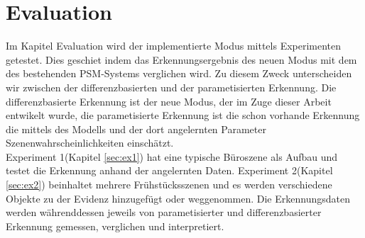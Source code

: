 \chapter{Evaluation}\label{ch:evaluation}
Im Kapitel Evaluation wird der implementierte Modus mittels Experimenten getestet. Dies geschiet indem das Erkennungsergebnis des neuen Modus mit dem des bestehenden PSM-Systems verglichen wird. Zu diesem Zweck unterscheiden wir zwischen der differenzbasierten und der parametisierten Erkennung. Die differenzbasierte Erkennung ist der neue Modus, der im Zuge dieser Arbeit entwikelt wurde, die parametisierte Erkennung ist die schon vorhande Erkennung die mittels des Modells und der dort angelernten Parameter Szenenwahrscheinlichkeiten einschätzt.\smallskip\\
Experiment 1(Kapitel \ref{sec:ex1}) hat eine typische Büroszene als Aufbau und testet die Erkennung anhand der angelernten Daten. Experiment 2(Kapitel \ref{sec:ex2}) beinhaltet mehrere Frühstücksszenen und es werden verschiedene Objekte zu der Evidenz hinzugefügt oder weggenommen. Die Erkennungsdaten werden   währenddessen jeweils von parametisierter und differenzbasierter Erkennung gemessen, verglichen und interpretiert.
